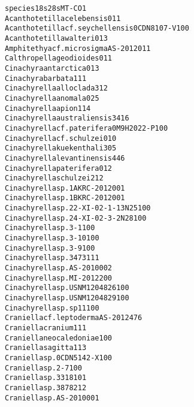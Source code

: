 \documentclass[letterpaper,10pt,english]{/usr/share/sphinx/texinputs/sphinxhowto}
\newenvironment{InvisibleVerbatim}
        {\begin{mdframed}[leftmargin=0.1\linewidth,innerleftmargin=3pt,innerrightmargin=3pt, userdefinedwidth=1\linewidth, linewidth=0pt, linecolor=white, usetwoside=false]}
        {\end{mdframed}}
\begin{document}
                \begin{InvisibleVerbatim}
                \vspace{-0.5\baselineskip}
\begin{alltt}species                                       18s   28s   MT-CO1
Acanthotetilla celebensis                     0     1     1
Acanthotetilla cf. seychellensis 0CDN8107-V   1     0     0
Acanthotetilla walteri                        0     1     3
Amphitethya cf. microsigma AS-2012            0     1     1
Calthropella geodioides                       0     1     1
Cinachyra antarctica                          0     1     3
Cinachyra barbata                             1     1     1
Cinachyrella alloclada                        3     1     2
Cinachyrella anomala                          0     2     5
Cinachyrella apion                            1     1     4
Cinachyrella australiensis                    3     4     16
Cinachyrella cf. paterifera 0M9H2022-P        1     0     0
Cinachyrella cf. schulzei                     0     1     0
Cinachyrella kuekenthali                      3     0     5
Cinachyrella levantinensis                    4     4     6
Cinachyrella paterifera                       0     1     2
Cinachyrella schulzei                         2     1     2
Cinachyrella sp. 1A KRC-2012                  0     0     1
Cinachyrella sp. 1B KRC-2012                  0     0     1
Cinachyrella sp. 22-XI-02-1-13 N25            1     0     0
Cinachyrella sp. 24-XI-02-3-2 N28             1     0     0
Cinachyrella sp. 3-1                          1     0     0
Cinachyrella sp. 3-10                         1     0     0
Cinachyrella sp. 3-9                          1     0     0
Cinachyrella sp. 3473                         1     1     1
Cinachyrella sp. AS-2010                      0     0     2
Cinachyrella sp. MI-2012                      2     0     0
Cinachyrella sp. USNM 1204826                 1     0     0
Cinachyrella sp. USNM 1204829                 1     0     0
Cinachyrella sp. sp11                         1     0     0
Craniella cf. leptoderma AS-2012              4     7     6
Craniella cranium                             1     1     1
Craniella neocaledoniae                       1     0     0
Craniella sagitta                             1     1     3
Craniella sp. 0CDN5142-X                      1     0     0
Craniella sp. 2-7                             1     0     0
Craniella sp. 3318                            1     0     1
Craniella sp. 3878                            2     1     2
Craniella sp. AS-2010                         0     0     1

\end{alltt}
\end{InvisibleVerbatim}
\end{document}
